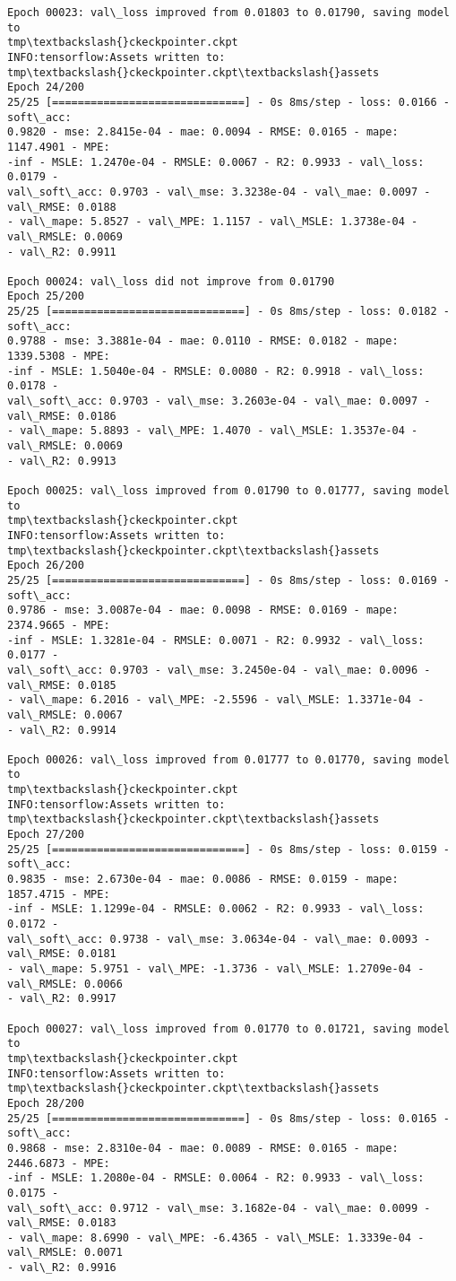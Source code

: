 \documentclass[11pt]{article}
\begin{document}
\begin{Verbatim}[commandchars=\\\{\}]
Epoch 00023: val\_loss improved from 0.01803 to 0.01790, saving model to
tmp\textbackslash{}ckeckpointer.ckpt
INFO:tensorflow:Assets written to: tmp\textbackslash{}ckeckpointer.ckpt\textbackslash{}assets
Epoch 24/200
25/25 [==============================] - 0s 8ms/step - loss: 0.0166 - soft\_acc:
0.9820 - mse: 2.8415e-04 - mae: 0.0094 - RMSE: 0.0165 - mape: 1147.4901 - MPE:
-inf - MSLE: 1.2470e-04 - RMSLE: 0.0067 - R2: 0.9933 - val\_loss: 0.0179 -
val\_soft\_acc: 0.9703 - val\_mse: 3.3238e-04 - val\_mae: 0.0097 - val\_RMSE: 0.0188
- val\_mape: 5.8527 - val\_MPE: 1.1157 - val\_MSLE: 1.3738e-04 - val\_RMSLE: 0.0069
- val\_R2: 0.9911

Epoch 00024: val\_loss did not improve from 0.01790
Epoch 25/200
25/25 [==============================] - 0s 8ms/step - loss: 0.0182 - soft\_acc:
0.9788 - mse: 3.3881e-04 - mae: 0.0110 - RMSE: 0.0182 - mape: 1339.5308 - MPE:
-inf - MSLE: 1.5040e-04 - RMSLE: 0.0080 - R2: 0.9918 - val\_loss: 0.0178 -
val\_soft\_acc: 0.9703 - val\_mse: 3.2603e-04 - val\_mae: 0.0097 - val\_RMSE: 0.0186
- val\_mape: 5.8893 - val\_MPE: 1.4070 - val\_MSLE: 1.3537e-04 - val\_RMSLE: 0.0069
- val\_R2: 0.9913

Epoch 00025: val\_loss improved from 0.01790 to 0.01777, saving model to
tmp\textbackslash{}ckeckpointer.ckpt
INFO:tensorflow:Assets written to: tmp\textbackslash{}ckeckpointer.ckpt\textbackslash{}assets
Epoch 26/200
25/25 [==============================] - 0s 8ms/step - loss: 0.0169 - soft\_acc:
0.9786 - mse: 3.0087e-04 - mae: 0.0098 - RMSE: 0.0169 - mape: 2374.9665 - MPE:
-inf - MSLE: 1.3281e-04 - RMSLE: 0.0071 - R2: 0.9932 - val\_loss: 0.0177 -
val\_soft\_acc: 0.9703 - val\_mse: 3.2450e-04 - val\_mae: 0.0096 - val\_RMSE: 0.0185
- val\_mape: 6.2016 - val\_MPE: -2.5596 - val\_MSLE: 1.3371e-04 - val\_RMSLE: 0.0067
- val\_R2: 0.9914

Epoch 00026: val\_loss improved from 0.01777 to 0.01770, saving model to
tmp\textbackslash{}ckeckpointer.ckpt
INFO:tensorflow:Assets written to: tmp\textbackslash{}ckeckpointer.ckpt\textbackslash{}assets
Epoch 27/200
25/25 [==============================] - 0s 8ms/step - loss: 0.0159 - soft\_acc:
0.9835 - mse: 2.6730e-04 - mae: 0.0086 - RMSE: 0.0159 - mape: 1857.4715 - MPE:
-inf - MSLE: 1.1299e-04 - RMSLE: 0.0062 - R2: 0.9933 - val\_loss: 0.0172 -
val\_soft\_acc: 0.9738 - val\_mse: 3.0634e-04 - val\_mae: 0.0093 - val\_RMSE: 0.0181
- val\_mape: 5.9751 - val\_MPE: -1.3736 - val\_MSLE: 1.2709e-04 - val\_RMSLE: 0.0066
- val\_R2: 0.9917

Epoch 00027: val\_loss improved from 0.01770 to 0.01721, saving model to
tmp\textbackslash{}ckeckpointer.ckpt
INFO:tensorflow:Assets written to: tmp\textbackslash{}ckeckpointer.ckpt\textbackslash{}assets
Epoch 28/200
25/25 [==============================] - 0s 8ms/step - loss: 0.0165 - soft\_acc:
0.9868 - mse: 2.8310e-04 - mae: 0.0089 - RMSE: 0.0165 - mape: 2446.6873 - MPE:
-inf - MSLE: 1.2080e-04 - RMSLE: 0.0064 - R2: 0.9933 - val\_loss: 0.0175 -
val\_soft\_acc: 0.9712 - val\_mse: 3.1682e-04 - val\_mae: 0.0099 - val\_RMSE: 0.0183
- val\_mape: 8.6990 - val\_MPE: -6.4365 - val\_MSLE: 1.3339e-04 - val\_RMSLE: 0.0071
- val\_R2: 0.9916


\end{Verbatim}
\end{document}
